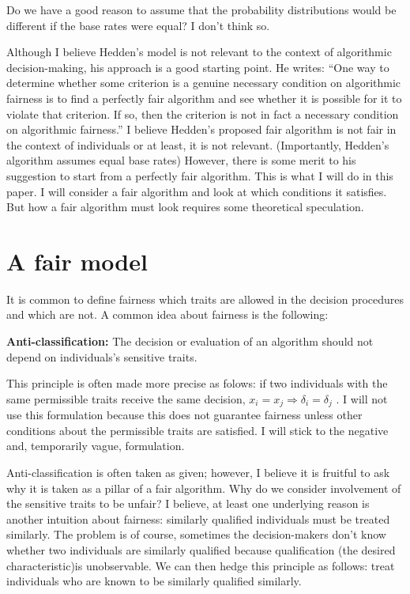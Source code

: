 \documentclass{article}
\begin{document}
Do we have a good reason to assume that the probability distributions would be different if the base rates were equal? I don't think so. 


Although I believe Hedden's model is not relevant to the context of algorithmic decision-making, his approach is a good starting point. He writes: “One way to determine whether some criterion is a genuine necessary condition on algorithmic fairness is to find a perfectly fair algorithm and see whether it is possible for it to violate that criterion. If so, then the criterion is not in fact a necessary condition on algorithmic fairness.” I believe Hedden’s proposed fair algorithm is not fair in the context of individuals or at least, it is not relevant. (Importantly, Hedden’s algorithm assumes equal base rates) However, there is some merit to his suggestion to start from a perfectly fair algorithm. This is what I will do in this paper. I will consider a fair algorithm and look at which conditions it satisfies. But how a fair algorithm must look requires some theoretical speculation.


\section{A fair model}

It is common to define fairness which traits are allowed in the decision procedures and which are not. A common idea about fairness is the following: 

 \textbf{Anti-classification:} The decision or evaluation of an algorithm should not depend on individuals's sensitive traits. 

This principle is often made more precise as folows: if two individuals with the same permissible traits receive the same decision, $x_i = x_j \Rightarrow \delta_i = \delta_j $ \cite[p. 8]{Patty_Penn_2023}. I will not use this formulation because this does not guarantee fairness unless other conditions about the permissible traits are satisfied. I will stick to the negative and, temporarily vague, formulation. 

Anti-classification is often taken as given; however, I believe it is fruitful to ask why it is taken as a pillar of a fair algorithm. Why do we consider involvement of the sensitive traits to be unfair? I believe, at least one underlying reason is another intuition about fairness: similarly qualified individuals must be treated similarly. The problem is of course, sometimes the decision-makers don't know whether two individuals are similarly qualified because qualification (the desired characteristic)is unobservable. We can then hedge this principle as follows: treat individuals who are known to be similarly qualified similarly.
\end{document}

